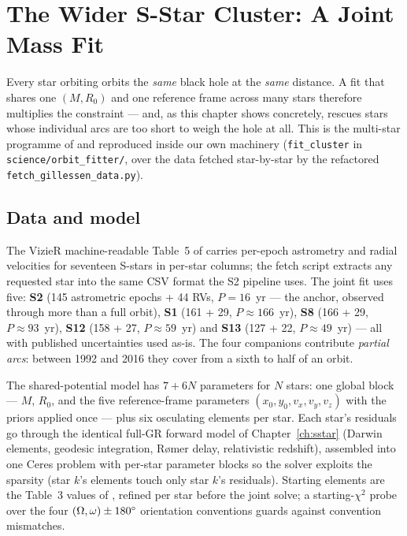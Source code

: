 \chapter{The Wider S-Star Cluster: A Joint Mass Fit}
\label{ch:cluster}

Every star orbiting \sgra{} orbits the \emph{same} black hole at the
\emph{same} distance. A fit that shares one $(M, R_0)$ and one
reference frame across many stars therefore multiplies the constraint —
and, as this chapter shows concretely, rescues stars whose individual
arcs are too short to weigh the hole at all. This is the multi-star
programme of \citet{Gillessen2017} and \citet{Gravity2022} reproduced
inside our own machinery (\texttt{fit\_cluster} in
\texttt{science/orbit\_fitter/}, over the data fetched star-by-star by
the refactored \texttt{fetch\_gillessen\_data.py}).

\section{Data and model}
\label{sec:clusterdata}

The VizieR machine-readable Table~5 of \citet{Gillessen2017} carries
per-epoch astrometry and radial velocities for seventeen S-stars in
per-star columns; the fetch script extracts any requested star into the
same CSV format the S2 pipeline uses. The joint fit uses five:
\textbf{S2} (145 astrometric epochs + 44 RVs, $P = 16$~yr — the anchor,
observed through more than a full orbit), \textbf{S1} (161 + 29,
$P \approx 166$~yr), \textbf{S8} (166 + 29, $P \approx 93$~yr),
\textbf{S12} (158 + 27, $P \approx 59$~yr) and \textbf{S13} (127 + 22,
$P \approx 49$~yr) — all with published uncertainties used as-is. The
four companions contribute \emph{partial arcs}: between 1992 and 2016
they cover from a sixth to half of an orbit.

The shared-potential model has $7 + 6N$ parameters for $N$ stars: one
global block — $M$, $R_0$, and the five reference-frame parameters
$(x_0, y_0, v_x, v_y, v_z)$ with the \citet{Plewa2015} priors applied
once — plus six osculating elements per star. Each star's residuals go
through the identical full-GR forward model of Chapter~\ref{ch:sstar}
(Darwin elements, geodesic integration, R{\o}mer delay, relativistic
redshift), assembled into one Ceres problem with per-star parameter
blocks so the solver exploits the sparsity (star $k$'s elements touch
only star $k$'s residuals). Starting elements are the Table~3 values of
\citet{Gillessen2017}, refined per star before the joint solve; a
starting-$\chi^2$ probe over the four $(\Omega, \omega) \pm 180^\circ$
orientation conventions guards against convention mismatches.

